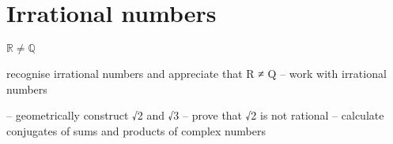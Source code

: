 \chapter{Irrational  numbers }

$\mathbb{R}\neq\mathbb{Q}$




recognise irrational numbers and
appreciate that R ≠ Q
– work with irrational numbers

– geometrically construct √2 and √3
– prove that √2 is not rational
– calculate conjugates of sums and
products of complex numbers